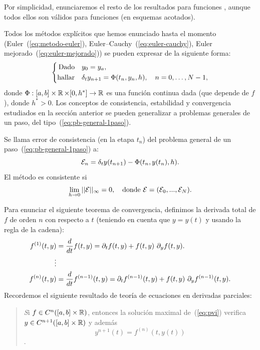 Por simplicidad, enunciaremos  el resto de los resultados para
funciones \globLipschitz, aunque todos ellos son válidos para
funciones \locLipschitz (en esquemas acotados).


Todos los métodos explícitos que hemos enunciado hasta el momento
(Euler~(\ref{eq:metodo-euler}), Euler--Cauchy~(\ref{eq:euler-cauchy}),
Euler mejorado~(\ref{eq:euler-mejorado})) se pueden expresar de la
siguiente forma:
\begin{equation}
  \label{eq:pb-general-1paso} 
  \left\{
  \begin{aligned}
    \text{Dado}\quad &y_0 = {y_a},\\
    \text{hallar}\quad &\delta_t {y_{n+1}} = \Phi({t_n},{y_n}, h), \quad n=0,\dots,
    N-1,
  \end{aligned}
  \right.
\end{equation}
donde $\Phi:[a,b]\times \operatorname{{\mathbb R}} \times [0,h^*] \to \operatorname{{\mathbb R}}$ es una
función continua dada (que depende de $f$), donde $h^*>0$. Los
conceptos de consistencia, estabilidad y convergencia estudiados en la
sección anterior se pueden generalizar a problemas generales de un
paso, del tipo~(\ref{eq:pb-general-1paso}).

\begin{definition}
  Se llama error de consistencia (en la etapa $t_n$) del problema
  general de un paso~(\ref{eq:pb-general-1paso}) a:
  $${\cal E}_n=\delta_t y({t_{n+1}}) - \Phi({t_n},y({t_n}),h).$$
  El método es consistente si
  $$
  \lim_{h\to 0} ||{\cal E}||_\infty  = 0, \quad \text{donde } {\cal
    E}=({\cal E}_0,...,{\cal E}_N).
  $$
\end{definition}

\newcommand{\Dtotal}[2]{#2^{(#1)}}%
Para enunciar el siguiente teorema de convergencia, definimos la
derivada total de $f$ de orden $n$ con respecto a $t$ (teniendo en
cuenta que $y=y(t)$ y usando la regla de la cadena):
\begin{align*}
  \Dtotal 1 f(t,y) & = \frac{d}{dt}f(t,y) =
  \dt f(t,y) 
  + f(t,y)\ \dy f (t,y).
  \\
  \vdots
  \\
  \Dtotal n f(t,y) &= \frac{d}{dt}\Dtotal{n-1}f(t,y) =
  \dt \Dtotal {n-1} f(t,y) 
  + f(t,y) \ \dy\Dtotal {n-1}f (t,y).
\end{align*}
Recordemos el siguiente resultado de teoría de ecuaciones en derivadas
parciales:
\begin{quotation}
  \emph Si $f\in C^n([a,b]\times\operatorname{{\mathbb R}})$, entonces la solución
  maximal de~(\ref{eq:pvi}) verifica $y\in
  C^{n+1}([a,b]\times\operatorname{{\mathbb R}})$ y además $$y^{n+1}(t)=\Dtotal n f(t,
  y(t))$$.
\end{quotation}

